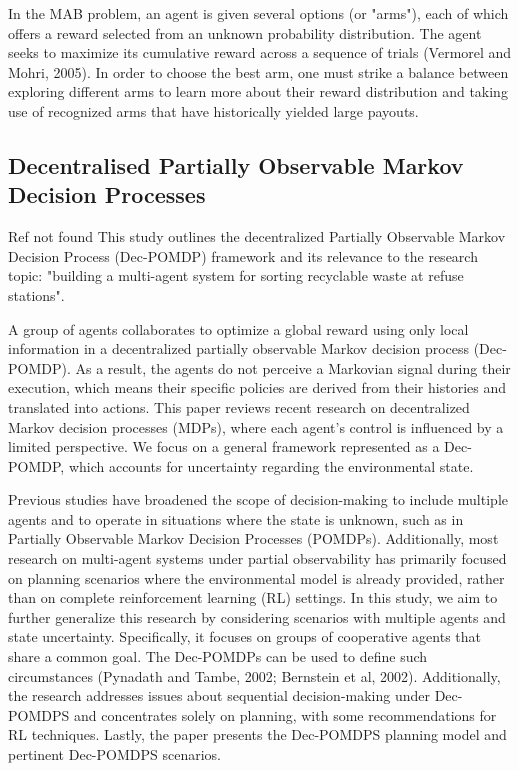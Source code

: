 In the MAB problem, an agent is given several options (or "arms"), each of which offers a reward selected from an unknown probability distribution. The agent seeks to maximize its cumulative reward across a sequence of trials (Vermorel and Mohri, 2005). In order to choose the best arm, one must strike a balance between exploring different arms to learn more about their reward distribution and taking use of recognized arms that have historically yielded large payouts.


\subsection{Decentralised Partially Observable Markov Decision Processes}
\label{sub:lit-rev_dec-pomdp}

Ref not found
This study outlines the decentralized Partially Observable Markov Decision Process (Dec-POMDP) framework and its relevance to the research topic: "building a multi-agent system for sorting recyclable waste at refuse stations".


A group of agents collaborates to optimize a global reward using only local information in a decentralized partially observable Markov decision process (Dec-POMDP). As a result, the agents do not perceive a Markovian signal during their execution, which means their specific policies are derived from their histories and translated into actions. This paper reviews recent research on decentralized Markov decision processes (MDPs), where each agent's control is influenced by a limited perspective. We focus on a general framework represented as a Dec-POMDP, which accounts for uncertainty regarding the environmental state.


Previous studies have broadened the scope of decision-making to include multiple agents and to operate in situations where the state is unknown, such as in Partially Observable Markov Decision Processes (POMDPs). Additionally, most research on multi-agent systems under partial observability has primarily focused on planning scenarios where the environmental model is already provided, rather than on complete reinforcement learning (RL) settings. In this study, we aim to further generalize this research by considering scenarios with multiple agents and state uncertainty. Specifically, it focuses on groups of cooperative agents that share a common goal. The Dec-POMDPs can be used to define such circumstances (Pynadath and Tambe, 2002; Bernstein et al, 2002).  Additionally, the research addresses issues about sequential decision-making under Dec-POMDPS and concentrates solely on planning, with some recommendations for RL techniques. Lastly, the paper presents the Dec-POMDPS planning model and pertinent Dec-POMDPS scenarios.

